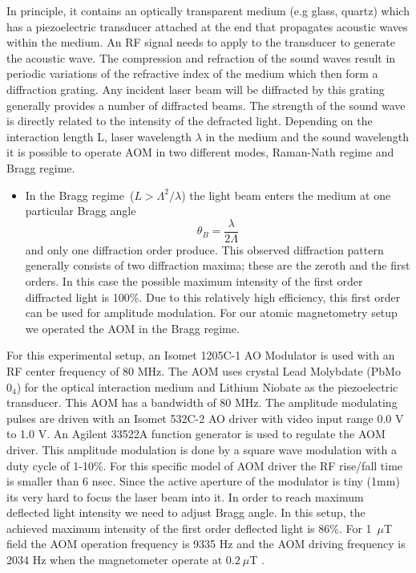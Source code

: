  In principle, it contains an optically transparent medium (e.g glass, quartz) which has a piezoelectric transducer attached at the end that propagates acoustic waves within the medium. An RF signal needs to apply to the transducer to generate the acoustic wave. The compression and refraction of the sound waves result in periodic variations of the refractive index of the medium which then form a diffraction grating. Any incident laser beam will be diffracted by this grating generally provides a number of diffracted beams. The strength of the sound wave is directly related to the intensity of the defracted light. Depending on the interaction length L, laser wavelength $\lambda$ in the medium and the sound wavelength it is possible to operate AOM in two different modes, Raman-Nath regime and Bragg regime.

\begin{itemize}
\item In the Bragg regime~($L > \Lambda^2/\lambda$) the light beam enters the medium at one particular Bragg angle 
\begin{equation}
\theta_B=\frac{\lambda}{2\Lambda}
\end{equation}                                 
and only one diffraction order produce. This observed diffraction pattern generally consists of two diffraction maxima; these are the zeroth and the first orders. In this case the possible maximum intensity of the first order diffracted light is 100\%. Due to this relatively high efficiency, this first order can be used for amplitude modulation. For our atomic magnetometry setup we operated the AOM in the Bragg regime.
\end{itemize}
 For this experimental setup, an Isomet 1205C-1 AO Modulator  is used with an RF center frequency of 80 MHz. The AOM uses crystal Lead Molybdate (PbMo$0_4$) for the optical interaction medium and Lithium Niobate as the piezoelectric transducer. This AOM has a bandwidth of 80 MHz.  The amplitude modulating pulses are driven with an Isomet 532C-2 AO driver with video input range 0.0 V to 1.0 V. An Agilent 33522A function generator is used to regulate the  AOM driver. This amplitude modulation is done by a square wave modulation with a duty cycle of 1-10\%. For this specific model of AOM driver the RF rise/fall time is smaller than 6 nsec. Since the active aperture of the modulator is tiny (1mm) its very hard to focus the laser beam into it. In order to reach maximum deflected light intensity we need to adjust Bragg angle. In this setup, the achieved maximum intensity of the first order deflected light is 86$\%$. For  1~$\mu$T field the AOM operation frequency is 9335 Hz and the AOM driving frequency is 2034 Hz when the magnetometer operate at $0.2~ \mu$T .
